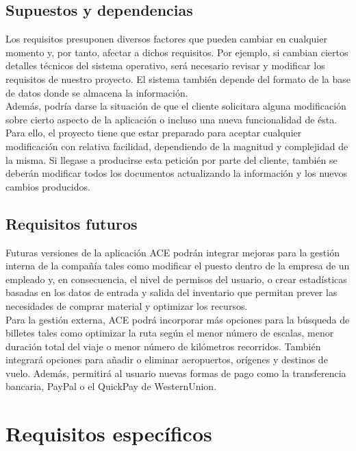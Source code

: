 \documentclass[11pt, a4paper, twoside, titlepage]{article}
\begin{document}
		\subsection{Supuestos y dependencias}
			Los requisitos presuponen diversos factores que pueden cambiar en cualquier momento y, por tanto, afectar a dichos requisitos. Por ejemplo, si cambian ciertos detalles técnicos del sistema operativo, será necesario revisar y modificar los requisitos de nuestro proyecto. El sistema también depende del formato de la base de datos donde se almacena la información. \\
			
			Además, podría darse la situación de que el cliente solicitara alguna modificación sobre cierto aspecto de la aplicación o incluso una nueva funcionalidad de ésta. Para ello, el proyecto tiene que estar preparado para aceptar cualquier modificación con relativa facilidad, dependiendo de la magnitud y complejidad de la misma. Si llegase a producirse esta petición por parte del cliente, también se deberán modificar todos los documentos actualizando la información y los nuevos cambios producidos.

		\subsection{Requisitos futuros}
			Futuras versiones de la aplicación ACE podrán integrar mejoras para la gestión interna de la compañía tales como modificar el puesto dentro de la empresa de un empleado y, en consecuencia, el nivel de permisos del usuario, o crear estadísticas basadas en los datos de entrada y salida del inventario que permitan prever las necesidades de comprar material y optimizar los recursos. \\
		
			Para la gestión externa, ACE podrá incorporar más opciones para la búsqueda de billetes tales como optimizar la ruta según el menor número de escalas, menor duración total del viaje o menor número de kilómetros recorridos. También integrará opciones para añadir o eliminar aeropuertos, orígenes y destinos de vuelo. Además, permitirá al usuario nuevas formas de pago como la transferencia bancaria, \gls{PayPal} o el \gls{QuickPay} de \gls{WesternUnion}.

	\section{Requisitos específicos}
\end{document}
